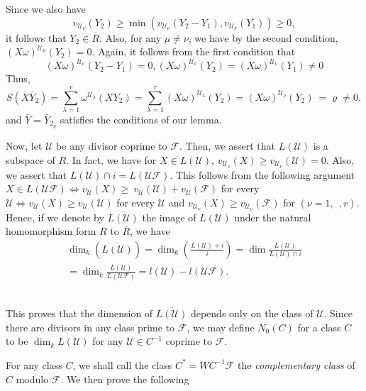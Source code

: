 Since we also have
$$
 v_{\mathscr{U}_{\nu}} (Y_2) \ge \min ( v_{\mathscr{U}_{\nu}} ( Y_2
 -Y_1 ) ,  v_{\mathscr{U}_{\nu}} (Y_1)) \ge 0 , 
 $$
 it follows that $ Y_2 \in \bar{R} $. Also, for any $ \mu \neq \nu $,
 we have by the second condition, $ (X \omega )^{\mathscr{U}_\mu}
 (Y_2) = 0 $. Again, it follows from the first condition that  
 $$
(X \omega ) ^{\mathscr{U}_\nu} ( Y_2 - Y_1 ) = 0, ( X \omega )
 ^{\mathscr{U}_\nu} (Y_2) = (X \omega) ^{\mathscr{U}_\nu} (Y_1) \neq 0  
$$ 
Thus, 
$$
S ( \bar{X} \bar{Y}_2 ) = \sum^{r}_{\lambda=1}
\omega^{\mathscr{U}_\lambda} (XY_2 ) = \sum^{r}_{\lambda=1} (X \omega
)^{\mathscr{U}_\lambda } (Y_2) = (X \omega )^{\mathscr{U}_\nu} (Y_2) ~
=  \varrho \neq 0, 
$$
and $ \bar{Y} = \bar{Y}_{2_{\bar{\varrho}}} $ satisfies the conditions
of our lemma. 

Now, let $ \mathscr{U} $ be any divisor coprime to $ \mathcal{F}
$. Then, we assert that $ L (\mathscr{U}) $ is a subspace of $R$. In
fact, we have for  $ X \in L (\mathscr{U}) $, $v_{\mathscr{U}_{\nu}}
(X) \ge v_{\mathscr{U}_{\nu}}  (\mathscr{U}) = 0 $. Also, we assert
that  $ L ( \mathscr{U} ) \cap i = L ( \mathscr{U}
\mathcal{F} ) $. This follows from the following argument $X \in L (
\mathscr{U} \mathcal{F}) \Longleftrightarrow v_{\mathscr{U}} (X) \ge ~
v_\mathscr{U} (\mathscr{U}) + v_\mathscr{U} ( \mathcal{F}) $  for
every $\mathscr{U} \Longleftrightarrow v_{\mathscr{U}} (X) \geq
v_{\mathscr{U}}(\mathscr{U})$ for every $\mathscr{U}$ and
$v_{\mathscr{U}_v} (X) \ge v_{\mathscr{U}_{\nu}}
( \mathcal{F} ) $ for $ ( \nu = 1, ~~ , r ) $. Hence, if we denote by
$ \overline{ L ( \mathscr{U} )} $ the image of $ L ( \mathscr{U} ) $
under the natural homomorphism form $ R $ to  $ \bar{R} $, we have  
\begin{multline*}
  \dim_k (\overline{L (\mathscr{U})}) = \dim_k  \left(
  \frac{L(\mathscr{U})+i}{i} \right) = \dim
  \frac{L(\mathscr{U})}{L(\mathscr{U})\cap i}\\ 
  = \dim_k
  \frac{L(\mathscr{U})}{L( \mathscr{U} \mathcal{F})} = l (\mathscr{U}) -
  l ( \mathscr{U} \mathcal{F}). 
\end{multline*}\pageoriginale\

This proves that the  dimension of $ \overline{L (\mathscr{U})} $ depends
only on the class of $ \mathscr{U} $. Since there are divisors in any
class prime to $ \mathcal{F} $, we may define $N_0 (C) $ for a class
$C$ to be $ \dim_k  \overline{L (\mathscr{U})} $ for any $ \mathscr{U}
\in C^{-1} $ coprime to  $ \mathcal{F} $. 

For any class $C$, we shall call the class $ C^* = WC^{-1} \mathcal{F}
$ the \textit{ complementary class } of $C$ modulo $ \mathcal{F} $. We
then prove the following  

